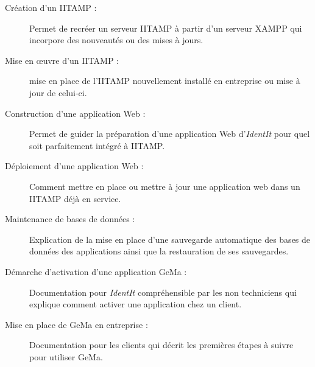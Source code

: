\begin{description}

  \item[Création d'un IITAMP :] Permet de recréer un serveur IITAMP à
    partir d'un serveur XAMPP qui incorpore des nouveautés ou des mises
    à jours.

  \item[Mise en \oe{}uvre d'un IITAMP :] mise en place de l'IITAMP
    nouvellement installé en entreprise ou mise à jour de celui-ci.

  \item[Construction d'une application Web :] Permet de guider la
    préparation d'une application Web d'\emph{IdentIt} pour quel soit
    parfaitement intégré à IITAMP.

  \item[Déploiement d'une application Web :] Comment mettre en place ou
    mettre à jour une application web dans un IITAMP déjà en service.

  \item[Maintenance de bases de données :] Explication de la mise en
    place d'une sauvegarde automatique des bases de données des
    applications ainsi que la restauration de ses sauvegardes.

  \item[Démarche d'activation d'une application GeMa :] Documentation
    pour \emph{IdentIt} compréhensible par les non techniciens qui
    explique comment activer une application chez un client.

  \item[Mise en place de GeMa en entreprise :] Documentation pour les
    clients qui décrit les premières étapes à suivre pour utiliser GeMa.

\end{description}

